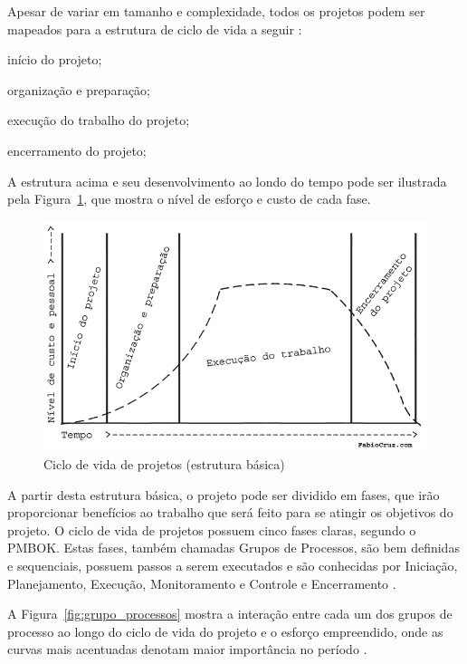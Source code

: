 \documentclass[
    12pt,               %
    openright,          %
    twoside,            %
    a4paper,            %
    chapter=TITLE,     %
    english,            %
    spanish,            %
    portuguese              %
    ]{abntex2}
\begin{document}
Apesar de variar em tamanho e complexidade, todos os projetos podem ser mapeados para a estrutura de ciclo de vida a seguir \cite[p.~39]{pmi2013}:

\begin{alineas}
	\item início do projeto;
	\item organização e preparação;
	\item execução do trabalho do projeto;
	\item encerramento do projeto;
\end{alineas}

A estrutura acima e seu desenvolvimento ao londo do tempo pode ser ilustrada pela Figura~\ref{fig:ciclo_vida_projeto}, que mostra o nível de esforço e custo de cada fase.

\begin{figure}[htb]
\RawFloats
	\caption{\label{fig:ciclo_vida_projeto}Ciclo de vida de projetos (estrutura básica)}
	\begin{center}
	    \includegraphics[scale=0.50]{figuras/ciclo_vida_projeto.png}
	\end{center}
\end{figure}

A partir desta estrutura básica, o projeto pode ser dividido em fases, que irão proporcionar benefícios ao trabalho que será feito para se atingir os objetivos do projeto. O ciclo de vida de projetos possuem cinco fases claras, segundo o PMBOK. Estas fases, também chamadas Grupos de Processos, são bem definidas e sequenciais, possuem passos a serem executados e são conhecidas por Iniciação, Planejamento, Execução, Monitoramento e Controle e Encerramento \cite[p.~14]{Cruz2013}. 

A Figura~\ref{fig:grupo_processos} mostra a interação entre cada um dos grupos de processo ao longo do ciclo de vida do projeto e o esforço empreendido, onde as curvas mais acentuadas denotam maior importância no período \cite[p.~15]{Rafael2012}. 
\end{document}
